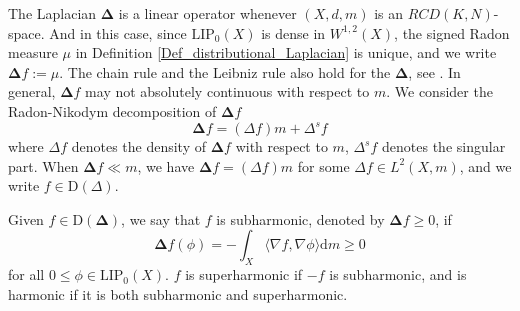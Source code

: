 \documentclass{article}
\theoremstyle{remark}
\numberwithin{equation}{section}
\theoremstyle{definition}
\begin{document}
     The Laplacian $\mathbf{\Delta}$ is a linear operator whenever $(X,d,m)$ is an $RCD(K,N)$-space. And in this case, since $\mathrm{LIP}_{0}(X)$ is dense in $W^{1,2}(X)$, the signed Radon measure $\mu$ in Definition \ref{Def_distributional_Laplacian} is unique, and we write $\mathbf{\Delta} f := \mu$. The chain rule and the Leibniz rule also hold for the $\mathbf{\Delta}$, see \cite[Section 4.2]{Gigli_2015}. In general, $\mathbf{\Delta} f$ may not absolutely continuous with respect to $m$. We consider the Radon-Nikodym decomposition of $\mathbf{\Delta} f$
     \begin{equation}
     	\mathbf{\Delta} f = (\Delta f)m + \Delta^{s} f
     \end{equation} 
     where $\Delta f$ denotes the density of $\mathbf{\Delta} f$ with respect to $m$, $\Delta^{s} f$ denotes the singular part. When $\mathbf{\Delta} f \ll m$, we have $\mathbf{\Delta} f = (\Delta f)m$ for some $\Delta f \in L^{2}(X,m)$, and we write $f \in \mathrm{D}(\Delta)$.
     
     Given $f \in \mathrm{D}(\mathbf{\Delta})$, we say that $f$ is subharmonic, denoted by $\mathbf{\Delta} f \ge 0$, if 
     \begin{equation}
     	\mathbf{\Delta}f (\phi) = - \int_{X} \langle \nabla f, \nabla \phi \rangle \mathrm{d}m \ge 0
     \end{equation}
     for all $0 \le \phi \in \mathrm{LIP}_{0}(X)$. $f$ is superharmonic if $-f$ is subharmonic, and is harmonic if it is both subharmonic and superharmonic.
     
\end{document}
